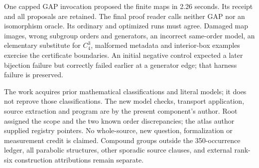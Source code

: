 \documentclass[11pt]{article}
\begin{document}
One capped GAP invocation proposed the finite maps in 2.26 seconds.
Its receipt and all proposals are retained. The final proof reader calls
neither GAP nor an isomorphism oracle. Its ordinary and optimized runs must
agree. Damaged map images, wrong subgroup orders and generators, an
incorrect same-order model, an elementary substitute for $C_4^3$, malformed
metadata and interior-box examples exercise the certificate boundaries.
An initial negative control expected a later bijection failure but correctly
failed earlier at a generator edge; that harness failure is preserved.

The work acquires prior mathematical classifications and literal models;
it does not reprove those classifications. The new model checks, transport
application, source extraction and program are by the present component's
author. Root assigned the scope and the two known order discrepancies;
the atlas author supplied registry pointers. No whole-source, new question,
formalization or measurement credit is claimed. Compound groups outside
the 350-occurrence ledger, all parabolic structures, other sporadic source
clauses, and external rank-six construction attributions remain separate.
\end{document}
